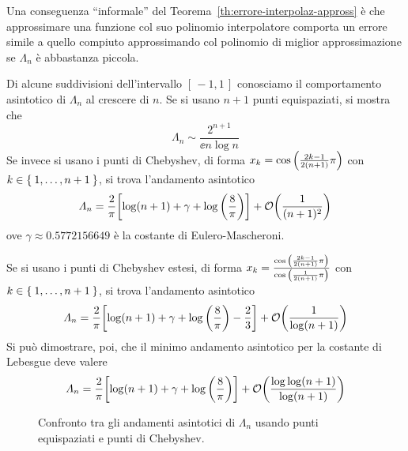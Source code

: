 	Una conseguenza “informale” del Teorema~\ref{th:errore-interpolaz-appross} è che approssimare una funzione col suo polinomio interpolatore comporta un errore simile a quello compiuto approssimando col polinomio di miglior approssimazione se \(\varLambda_n\) è abbastanza piccola.
	
	\begin{esempio}
		Di alcune suddivisioni dell'intervallo \([\, -1, 1 \,]\) conosciamo il comportamento asintotico di \(\varLambda_n\) al crescere di \(n\). Se si usano \(n + 1\) punti equispaziati, si mostra che
		\begin{equation*}
			\varLambda_n \sim \frac{2^{n + 1}}{\ee n \log n}
		\end{equation*}
		Se invece si usano i punti di Chebyshev, di forma \(x_k = \cos \qty(\frac{2 k - 1}{2 (n + 1)} \pi)\) con \(k \in \Set{1, \dots, n + 1}\), si trova l'andamento asintotico
		\begin{equation*}
			\varLambda_n = \frac{2}{\pi} \qty[\log (n + 1) + \gamma + \log \qty(\frac{8}{\pi})] + \order{\frac{1}{(n + 1)^2}}
		\end{equation*}
		ove \(\gamma \approx \num{0.5772156649}\) è la costante di Eulero-Mascheroni.
		
		Se si usano i punti di Chebyshev estesi, di forma \(x_k = \frac{\cos \qty(\frac{2 k - 1}{2 (n + 1)} \pi)}{\cos \qty(\frac{1}{2 (n + 1)} \pi)}\) con \(k \in \Set{1, \dots, n + 1}\), si trova l'andamento asintotico
		\begin{equation*}
			\varLambda_n = \frac{2}{\pi} \qty[\log (n + 1) + \gamma + \log \qty(\frac{8}{\pi}) - \frac{2}{3}] + \order{\frac{1}{\log(n + 1)}}
		\end{equation*}
		Si può dimostrare, poi, che il minimo andamento asintotico per la costante di Lebesgue deve valere
		\begin{equation*}
			\varLambda_n = \frac{2}{\pi} \qty[\log (n + 1) + \gamma + \log \qty(\frac{8}{\pi})] + \order{\frac{\log \log (n + 1)}{\log (n + 1)}}
		\end{equation*}
	\end{esempio}

	\begin{figure}[tpb]
		\centering
		
		
		\caption{Confronto tra gli andamenti asintotici di \(\varLambda_n\) usando punti equispaziati e punti di Chebyshev.}\label{fig:lebesgue-equisp-cheb}
	\end{figure}
